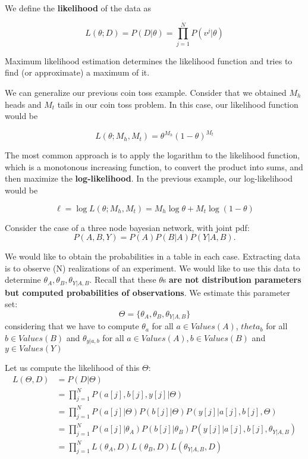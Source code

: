 We define the \textbf{likelihood} of the data as

\[
  L(\theta;D) = P(D|\theta) = \prod_{j=1}^N P(v^j|\theta)
\]

Maximum likelihood estimation determines the likelihood function and
tries to find (or approximate) a maximum of it.

We can generalize our previous coin toss example. Consider that we
obtained \(M_h\) heads and \(M_t\) tails in our coin toss problem. In
this case, our likelihood function would be

\[
  L(\theta; M_h,M_t) = \theta^{M_h} (1-\theta)^{M_t}
\]

The most common approach is to apply the logarithm to the likelihood
function, which is a monotonous increasing function, to convert the
product into sums, and then maximize the \textbf{log-likelihood}. In the
previous example, our log-likelihood would be

\[
  \ell = \log L(\theta; M_h,M_t) = M_h \log \theta + M_t \log (1-\theta)
\]

Consider the case of a three node bayesian network, with joint pdf: \[
  P(A,B,Y) = P(A)P(B|A)P(Y|A,B).
\]

We would like to obtain the probabilities in a table in each case.
Extracting data is to observe (N) realizations of an experiment. We
would like to use this data to determine
\(\theta_A,\theta_B,\theta_{Y|A,B}\). Recall that these \(\theta\)s
\textbf{are not distribution parameters but computed probabilities of
  observations}. We estimate this parameter set: \[
  \Theta = \{\theta_A,\theta_B,\theta_{Y|A,B}\}
\] considering that we have to compute \(\theta_a\) for all
\(a \in Values(A)\), \(theta_b\) for all \(b \in Values(B)\) and
\(\theta_{y|a,b}\) for all \(a\in Values(A), b \in Values(B)\) and
\(y \in Values(Y)\)

Let us compute the likelihood of this \(\Theta\): \begin{align*}
  L(\Theta,D) & = P(D|\Theta)                                                                        \\
              & = \prod_{j=1}^N P(a[j],b[j],y[j]|\Theta)                                             \\
              & = \prod_{j=1}^N P(a[j]|\Theta) P(b[j]|\Theta)P(y[j]|a[j],b[j],\Theta)                \\
              & = \prod_{j=1}^N P(a[j]|\theta_A) P(b[j]| \theta_B)P(y[j] | a[j],b[j],\theta_{Y|A,B}) \\
              & = \prod_{j=1}^N L(\theta_A,D) L(\theta_B,D) L(\theta_{Y|A,B},D)
\end{align*}

